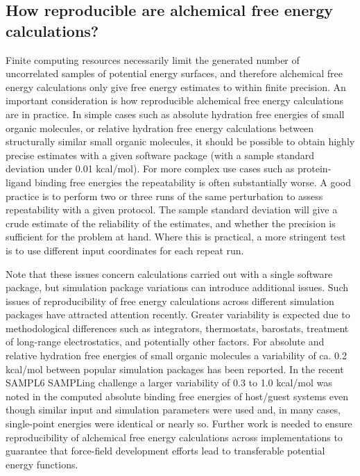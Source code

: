 \documentclass[9pt,bestpractices]{livecoms}
\begin{document}
\subsection{How reproducible are alchemical free energy calculations?}

Finite computing resources necessarily limit the generated number of uncorrelated samples of potential energy surfaces, and therefore alchemical free energy calculations only give free energy estimates to within finite precision. An important consideration is how reproducible alchemical free energy calculations are in practice. In simple cases such as absolute hydration free energies of small organic molecules, or relative hydration free energy calculations between structurally similar small organic molecules, it should be possible to obtain highly precise estimates with a given software package (with a sample standard deviation under 0.01 kcal/mol). For more complex use cases such as protein-ligand binding free energies the repeatability is often substantially worse. A good practice is to perform two or three runs of the same perturbation to assess repeatability with a given protocol. The sample standard deviation will give a crude estimate of the reliability of the estimates, and whether the precision is sufficient for the problem at hand. Where this is practical, a more stringent test is to use different input coordinates for each repeat run. 

Note that these issues concern calculations carried out with a single software package, but simulation package variations can introduce additional issues. Such issues of reproducibility of free energy calculations across different simulation packages have attracted attention recently. Greater variability is expected due to methodological differences such as integrators, thermostats, barostats, treatment of long-range electrostatics, and potentially other factors. For absolute and relative hydration free energies of small organic molecules a variability of ca. 0.2 kcal/mol between popular simulation packages has been reported. \cite{REF Reproducibility of hydration free energies Loefler et al.  JCTC 2018} In the recent SAMPL6 SAMPLing challenge a larger variability of 0.3 to 1.0 kcal/mol was noted in the computed absolute binding free energies of host/guest systems even though similar input and simulation parameters were used \cite{Ref Rizzi et al SAMPLing biorxiv} and, in many cases, single-point energies were identical or nearly so. Further work is needed to ensure reproducibility of alchemical free energy calculations across implementations to guarantee that force-field development efforts lead to transferable potential energy functions. 
\end{document}
